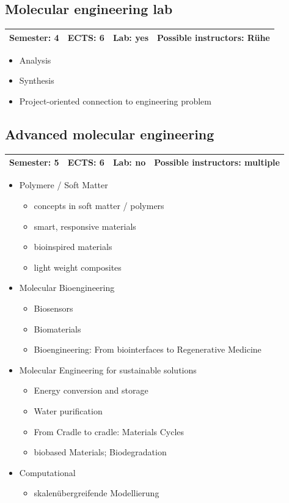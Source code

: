 \documentclass[12pt,twoside,fleqn,a4paper]{article}
\begin{document}
\subsection{Molecular engineering lab}
\begin{tabular}{llll} \hline
\textbf{Semester:} 4 & \textbf{ECTS:} 6 & \textbf{Lab:} yes & \textbf{Possible instructors:} Rühe\\
\hline
\end{tabular}

\begin{itemize}
\setlength\itemsep{0cm}
\item Analysis
\item Synthesis
\item Project-oriented connection to engineering problem
\end{itemize}


\subsection{Advanced molecular engineering}
\begin{tabular}{llll} \hline
\textbf{Semester:} 5 & \textbf{ECTS:} 6 & \textbf{Lab:} no & \textbf{Possible instructors:} multiple\\
\hline
\end{tabular}

\begin{itemize}
\setlength\itemsep{0cm}
\item Polymere / Soft Matter
\begin{itemize}
\item concepts in soft matter / polymers
\item smart, responsive materials
\item bioinspired materials
\item light weight composites
\end{itemize}

\item Molecular Bioengineering
\begin{itemize}
\item Biosensors
\item Biomaterials
\item Bioengineering: From biointerfaces to Regenerative Medicine
\end{itemize}

\item Molecular Engineering for sustainable solutions
\begin{itemize}
\item Energy conversion and storage
\item Water purification
\item From Cradle to cradle: Materials Cycles
\item biobased Materials; Biodegradation
\end{itemize}

\item Computational
\begin{itemize}
\item skalenübergreifende Modellierung
\end{itemize}
\end{itemize}
\end{document}
